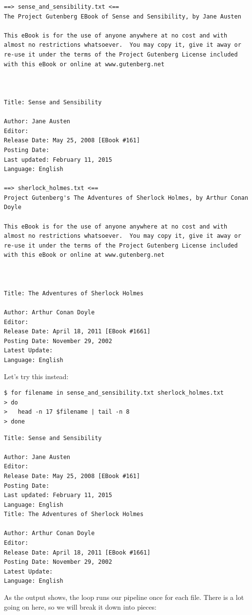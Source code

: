 \documentclass[
]{krantz}
\begin{document}
\begin{verbatim}
==> sense_and_sensibility.txt <==
The Project Gutenberg EBook of Sense and Sensibility, by Jane Austen

This eBook is for the use of anyone anywhere at no cost and with
almost no restrictions whatsoever.  You may copy it, give it away or
re-use it under the terms of the Project Gutenberg License included
with this eBook or online at www.gutenberg.net



Title: Sense and Sensibility

Author: Jane Austen
Editor:
Release Date: May 25, 2008 [EBook #161]
Posting Date:
Last updated: February 11, 2015
Language: English

==> sherlock_holmes.txt <==
Project Gutenberg's The Adventures of Sherlock Holmes, by Arthur Conan Doyle

This eBook is for the use of anyone anywhere at no cost and with
almost no restrictions whatsoever.  You may copy it, give it away or
re-use it under the terms of the Project Gutenberg License included
with this eBook or online at www.gutenberg.net



Title: The Adventures of Sherlock Holmes

Author: Arthur Conan Doyle
Editor:
Release Date: April 18, 2011 [EBook #1661]
Posting Date: November 29, 2002
Latest Update:
Language: English
\end{verbatim}

Let's try this instead:

\begin{verbatim}
$ for filename in sense_and_sensibility.txt sherlock_holmes.txt
> do
>   head -n 17 $filename | tail -n 8
> done
\end{verbatim}

\begin{verbatim}
Title: Sense and Sensibility

Author: Jane Austen
Editor:
Release Date: May 25, 2008 [EBook #161]
Posting Date:
Last updated: February 11, 2015
Language: English
Title: The Adventures of Sherlock Holmes

Author: Arthur Conan Doyle
Editor:
Release Date: April 18, 2011 [EBook #1661]
Posting Date: November 29, 2002
Latest Update:
Language: English
\end{verbatim}

As the output shows,
the loop runs our pipeline once for each file.
There is a lot going on here,
so we will break it down into pieces:
\end{document}
